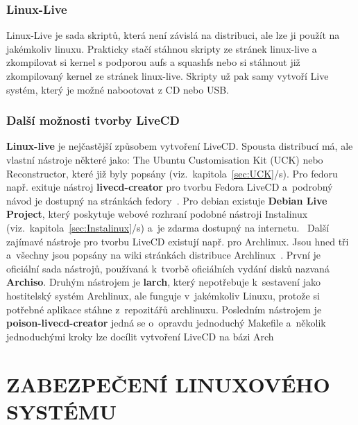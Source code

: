 \documentclass[a4paper,12pt]{article}
\newcommand{\upc}[1]{\uppercase{#1}} %
\newcommand{\odkazNaKapitolu}[1]{(viz.~kapitola~\ref{#1}/s\pageref{#1})}
\renewcommand{\b}[1]{\textbf{#1}} %
\begin{document}
\subsubsection{Linux-Live}
Linux-Live je sada skriptů, která není závislá na distribuci, ale lze ji použít na jakémkoliv linuxu. Prakticky stačí stáhnou skripty ze stránek linux-live a zkompilovat si kernel s podporou aufs a squashfs nebo si stáhnout již zkompilovaný kernel ze stránek linux-live. Skripty už pak samy vytvoří Live systém, který je možné nabootovat z CD nebo USB.


\subsubsection{Další možnosti tvorby LiveCD}
\b{Linux-live} je nejčastější způsobem vytvoření LiveCD. Spousta distribucí má, ale vlastní nástroje některé jako: The Ubuntu Customisation Kit (UCK) nebo Reconstructor, které již byly popsány \odkazNaKapitolu{sec:UCK}. Pro fedoru např. exituje nástroj \b{livecd-creator} pro tvorbu Fedora LiveCD a~podrobný návod je dostupný na stránkách fedory~\cite{FedoraLiveCDproject}. Pro debian existuje \textbf{Debian Live Project}, který poskytuje webové rozhraní podobné nástroji Instalinux \odkazNaKapitolu{sec:Instalinux} a~je zdarma dostupný na internetu.~\cite{DebianLiveProject}
Další zajímavé nástroje pro tvorbu LiveCD existují např. pro Archlinux. Jsou hned tři a~všechny jsou popsány na wiki stránkách distribuce Archlinux~\cite{ArchWiki-BuildLiveCD}. První je oficiální sada nástrojů, používaná k~tvorbě oficiálních vydání disků nazvaná \b{Archiso}. Druhým nástrojem je \b{larch}, který nepotřebuje k~sestavení jako hostitelský systém Archlinux, ale funguje v~jakémkoliv Linuxu, protože si potřebné aplikace stáhne z~repozitářů archlinuxu. Posledním nástrojem je \textbf{poison-livecd-creator} jedná se o~opravdu jednoduchý Makefile a~několik jednoduchými kroky lze docílit vytvoření LiveCD na bázi Arch


\section{\upc{Zabezpečení Linuxového systému}}
\end{document}
